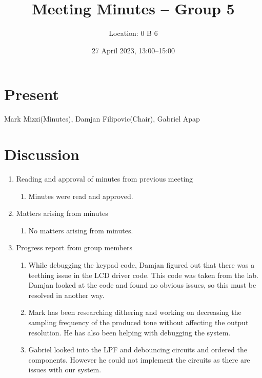 \documentclass[11pt,a4paper]{scrartcl}
\title{Meeting Minutes -- Group 5}
\author{Location: 0 B 6}
\date{27 April 2023, 13:00--15:00}
\begin{document}
\maketitle

\section*{Present}
Mark Mizzi(Minutes),
Damjan Filipovic(Chair),
Gabriel Apap

\section*{Discussion}

\begin{enumerate}
    \item Reading and approval of minutes from previous meeting
        \begin{enumerate}
            \item Minutes were read and approved.
        \end{enumerate}

    \item Matters arising from minutes
        \begin{enumerate}
            \item No matters arising from minutes.
        \end{enumerate}

    \item Progress report from group members
        \begin{enumerate}
            \item While debugging the keypad code, Damjan figured out that there was a teething issue in the LCD driver code. This code was taken from the lab. Damjan looked at the code and found no obvious issues, so this must be resolved in another way.
            \item Mark has been researching dithering and working on decreasing the sampling frequency of the produced tone without affecting the output resolution. He has also been helping with debugging the system.
            \item Gabriel looked into the LPF and debouncing circuits and ordered the components. However he could not implement the circuits as there are issues with our system.
        \end{enumerate}


\end{enumerate}
\end{document}
